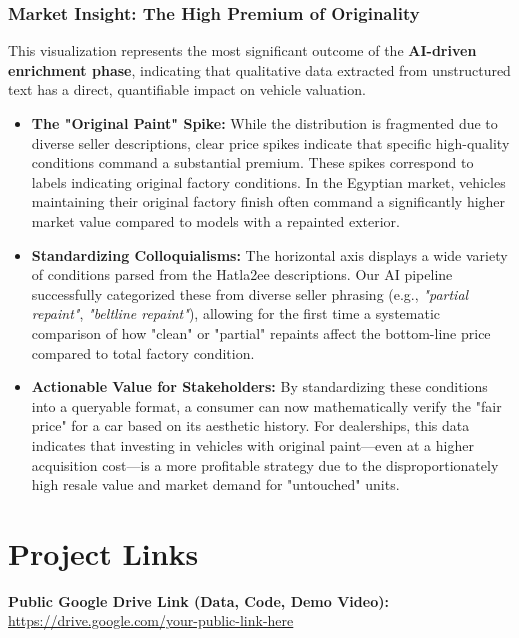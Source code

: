 \documentclass[12pt]{article}
\begin{document}
\subsubsection*{Market Insight: The High Premium of Originality}

This visualization represents the most significant outcome of the \textbf{AI-driven enrichment phase}, indicating that qualitative data extracted from unstructured text has a direct, quantifiable impact on vehicle valuation.

\begin{itemize}
    \item \textbf{The "Original Paint" Spike:} While the distribution is fragmented due to diverse seller descriptions, clear price spikes indicate that specific high-quality conditions command a substantial premium. These spikes correspond to labels indicating original factory conditions. In the Egyptian market, vehicles maintaining their original factory finish often command a significantly higher market value compared to models with a repainted exterior.
    \item \textbf{Standardizing Colloquialisms:} The horizontal axis displays a wide variety of conditions parsed from the Hatla2ee descriptions. Our AI pipeline successfully categorized these from diverse seller phrasing (e.g., \textit{"partial repaint"}, \textit{"beltline repaint"}), allowing for the first time a systematic comparison of how "clean" or "partial" repaints affect the bottom-line price compared to total factory condition.
    \item \textbf{Actionable Value for Stakeholders:} By standardizing these conditions into a queryable format, a consumer can now mathematically verify the "fair price" for a car based on its aesthetic history. For dealerships, this data indicates that investing in vehicles with original paint—even at a higher acquisition cost—is a more profitable strategy due to the disproportionately high resale value and market demand for "untouched" units.
\end{itemize}

\newpage
\section{Project Links}

\textbf{Public Google Drive Link (Data, Code, Demo Video):} \\
\url{https://drive.google.com/your-public-link-here}
\end{document}
